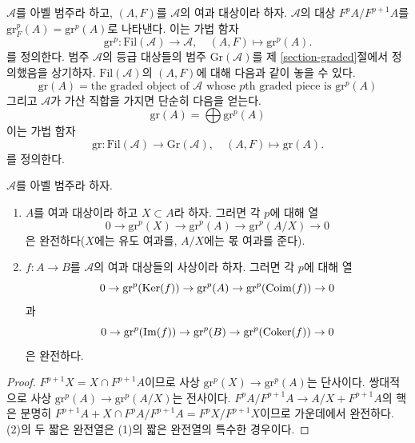 \noindent
$\mathcal{A}$를 아벨 범주라 하고, $(A, F)$를 $\mathcal{A}$의 여과
대상이라 하자. $\mathcal{A}$의 대상 $F^pA/F^{p + 1}A$를
$\text{gr}^p_F(A) = \text{gr}^p(A)$로 나타낸다. 이는 가법 함자
$$
\text{gr}^p :
\text{Fil}(\mathcal{A})
\longrightarrow
\mathcal{A}, \quad
(A, F)
\longmapsto
\text{gr}^p(A).
$$
를 정의한다.
범주 $\mathcal{A}$의 등급 대상들의 범주 $\text{Gr}(\mathcal{A})$를
제 \ref{section-graded}절에서 정의했음을 상기하자.
$\text{Fil}(\mathcal{A})$의 $(A, F)$에 대해 다음과 같이 놓을 수 있다.
$$
\text{gr}(A) = \text{the graded object of }\mathcal{A}\text{ whose }
p\text{th graded piece is }\text{gr}^p(A)
$$
그리고 $\mathcal{A}$가 가산 직합을 가지면 단순히 다음을 얻는다.
$$
\text{gr}(A) = \bigoplus \text{gr}^p(A)
$$
이는 가법 함자
$$
\text{gr} :
\text{Fil}(\mathcal{A})
\longrightarrow
\text{Gr}(\mathcal{A}), \quad
(A, F) \longmapsto \text{gr}(A).
$$
를 정의한다.

\begin{lemma}
\label{lemma-ses-gr}
$\mathcal{A}$를 아벨 범주라 하자.
\begin{enumerate}
\item $A$를 여과 대상이라 하고 $X \subset A$라 하자. 그러면 각 $p$에
대해 열
$$
0 \to \text{gr}^p(X) \to \text{gr}^p(A) \to \text{gr}^p(A/X) \to 0
$$
은 완전하다($X$에는 유도 여과를, $A/X$에는 몫 여과를 준다).
\item $f : A \to B$를 $\mathcal{A}$의 여과 대상들의 사상이라 하자.
그러면 각 $p$에 대해 열
$$
0 \to \text{gr}^p(\mathop{\mathrm{Ker}}(f)) \to \text{gr}^p(A) \to
\text{gr}^p(\mathop{\mathrm{Coim}}(f)) \to 0
$$
과
$$
0 \to \text{gr}^p(\mathop{\mathrm{Im}}(f)) \to \text{gr}^p(B) \to
\text{gr}^p(\mathop{\mathrm{Coker}}(f)) \to 0
$$
은 완전하다.
\end{enumerate}
\end{lemma}

\begin{proof}
$F^{p + 1}X = X \cap F^{p + 1}A$이므로 사상
$\text{gr}^p(X) \to \text{gr}^p(A)$는 단사이다. 쌍대적으로 사상
$\text{gr}^p(A) \to \text{gr}^p(A/X)$는 전사이다.
$F^pA/F^{p + 1}A \to A/X + F^{p + 1}A$의 핵은 분명히
$F^{p + 1}A + X \cap F^pA/F^{p + 1}A = F^pX/F^{p + 1}X$이므로
가운데에서 완전하다. (2)의 두 짧은 완전열은 (1)의 짧은 완전열의
특수한 경우이다.
\end{proof}

